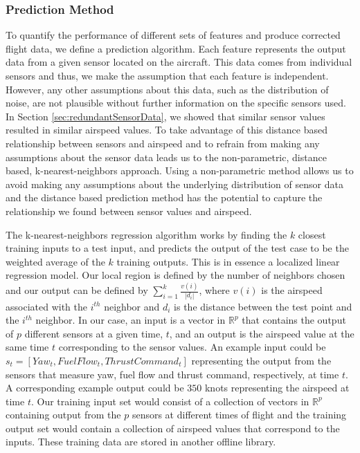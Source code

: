 \documentclass[]{aiaa-tc}
\begin{document}
\subsubsection{Prediction Method}
To quantify the performance of different sets of features and produce corrected flight data, we define a prediction algorithm. Each feature represents the output data from a given sensor located on the aircraft. This data comes from individual sensors and thus, we make the assumption that each feature is independent. However, any other assumptions about this data, such as the distribution of noise, are not plausible without further information on the specific sensors used. In Section \ref{sec:redundantSensorData}, we showed that similar sensor values resulted in similar airspeed values. To take advantage of this distance based relationship between sensors and airspeed and to refrain from making any assumptions about the sensor data leads us to the non-parametric, distance based, k-nearest-neighbors approach. Using a non-parametric method allows us to avoid making any assumptions about the underlying distribution of sensor data and the distance based prediction method has the potential to capture the relationship we found between sensor values and airspeed. 

The k-nearest-neighbors regression algorithm works by finding the $k$ closest training inputs to a test input, and predicts the output of the test case to be the weighted average of the $k$ training outputs. This is in essence a localized linear regression model. Our local region is defined by the number of neighbors chosen and our output can be defined by $\sum_{i = 1}^k \frac{v(i)}{|d_i|}$, where $v(i)$ is the airspeed associated with the $i^{th}$ neighbor and $d_i$ is the distance between the test point and the $i^{th}$ neighbor. In our case, an input is a vector in $\mathbb{R}^p$ that contains the output of $p$ different sensors at a given time, $t$, and an output is the airspeed value at the same time $t$ corresponding to the sensor values. An example input could be $s_t = [Yaw_t, Fuel Flow_t, Thrust Command_t]$ representing the output from the sensors that measure yaw, fuel flow and thrust command, respectively, at time $t$. A corresponding example output could be $350$ knots representing the airspeed at time $t$. Our training input set would consist of a collection of vectors in $\mathbb{R}^p$ containing output from the $p$ sensors at different times of flight and the training output set would contain a collection of airspeed values that correspond to the inputs. These training data are stored in another offline library. 
\end{document}
